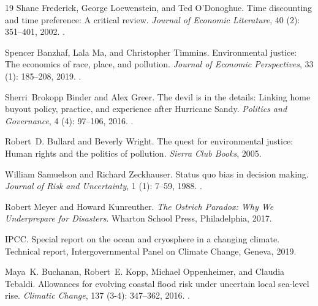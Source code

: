 \documentclass[11pt,letterpaper]{article}
\theoremstyle{definition}
\begin{document}
\begin{thebibliography}{19}
Shane Frederick, George Loewenstein, and Ted O'Donoghue.
\newblock Time discounting and time preference: A critical review.
\newblock \emph{Journal of Economic Literature}, 40 (2):
  351--401, 2002.
\newblock {}.

Spencer Banzhaf, Lala Ma, and Christopher Timmins.
\newblock Environmental justice: The economics of race, place, and pollution.
\newblock \emph{Journal of Economic Perspectives}, 33 (1):
  185--208, 2019.
\newblock {}.

Sherri~Brokopp Binder and Alex Greer.
\newblock The devil is in the details: Linking home buyout policy, practice,
  and experience after {Hurricane Sandy}.
\newblock \emph{Politics and Governance}, 4 (4): 97--106,
  2016.
\newblock {}.

Robert~D. Bullard and Beverly Wright.
\newblock The quest for environmental justice: Human rights and the politics of
  pollution.
\newblock \emph{Sierra Club Books}, 2005.

William Samuelson and Richard Zeckhauser.
\newblock Status quo bias in decision making.
\newblock \emph{Journal of Risk and Uncertainty}, 1 (1):
  7--59, 1988.
\newblock {}.

Robert Meyer and Howard Kunreuther.
\newblock \emph{The Ostrich Paradox: Why We Underprepare for Disasters}.
\newblock Wharton School Press, Philadelphia, 2017.

{IPCC}.
\newblock Special report on the ocean and cryosphere in a changing climate.
\newblock Technical report, Intergovernmental Panel on Climate Change, Geneva,
  2019.

Maya~K. Buchanan, Robert~E. Kopp, Michael Oppenheimer, and Claudia Tebaldi.
\newblock Allowances for evolving coastal flood risk under uncertain local
  sea-level rise.
\newblock \emph{Climatic Change}, 137 (3-4): 347--362, 2016.
\newblock {}.


\end{thebibliography}
\end{document}
